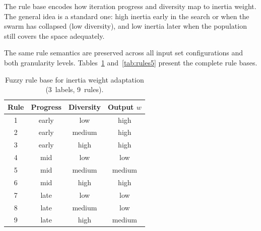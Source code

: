 \documentclass[conference]{IEEEtran}
\begin{document}
The rule base encodes how iteration progress and diversity map to inertia weight. The general idea is a standard one: high inertia early in the search or when the swarm has collapsed (low diversity), and low inertia later when the population still covers the space adequately.

The same rule semantics are preserved across all input set configurations and both granularity levels. Tables~\ref{tab:rules3} and~\ref{tab:rules5} present the complete rule bases.

\begin{table}[htbp]
\caption{Fuzzy rule base for inertia weight adaptation (3~labels, 9~rules).}
\label{tab:rules3}
\centering
\begin{tabular}{@{}cccc@{}}
\toprule
Rule & Progress & Diversity & Output $w$ \\ \midrule
1    & early    & low       & high   \\
2    & early    & medium    & high   \\
3    & early    & high      & high   \\\midrule
4    & mid      & low       & low    \\
5    & mid      & medium    & medium \\
6    & mid      & high      & high   \\\midrule
7    & late     & low       & low    \\
8    & late     & medium    & low    \\
9    & late     & high      & medium \\ \bottomrule
\end{tabular}
\end{table}
\end{document}
